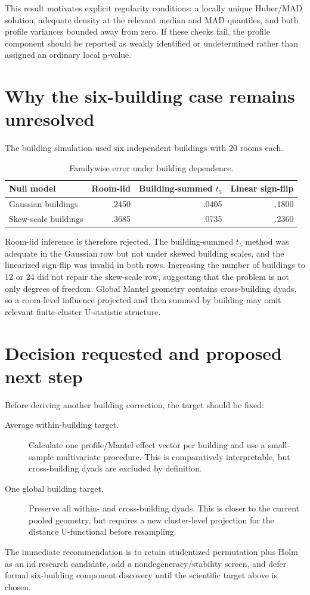 This result motivates explicit regularity conditions: a locally unique
Huber/MAD solution, adequate density at the relevant median and MAD
quantiles, and both profile variances bounded away from zero. If these checks
fail, the profile component should be reported as weakly identified or
undetermined rather than assigned an ordinary local p-value.

\section{Why the six-building case remains unresolved}

The building simulation used six independent buildings with 20 rooms each.

\begin{table}[ht]
\centering
\caption{Familywise error under building dependence.}
\small
\begin{tabular}{lrrr}
\hline
Null model & Room-iid & Building-summed $t_5$ & Linear sign-flip\\
\hline
Gaussian buildings & .2450 & .0405 & .1800\\
Skew-scale buildings & .3685 & .0735 & .2360\\
\hline
\end{tabular}
\end{table}

Room-iid inference is therefore rejected. The building-summed $t_5$ method
was adequate in the Gaussian row but not under skewed building scales, and
the linearized sign-flip was invalid in both rows. Increasing the number of
buildings to 12 or 24 did not repair the skew-scale row, suggesting that the
problem is not only degrees of freedom. Global Mantel geometry contains
cross-building dyads, so a room-level influence projected and then summed by
building may omit relevant finite-cluster U-statistic structure.

\section{Decision requested and proposed next step}

Before deriving another building correction, the target should be fixed:

\begin{description}
\item[Average within-building target.] Calculate one profile/Mantel effect
vector per building and use a small-sample multivariate procedure. This is
comparatively interpretable, but cross-building dyads are excluded by
definition.
\item[One global building target.] Preserve all within- and cross-building
dyads. This is closer to the current pooled geometry, but requires a new
cluster-level projection for the distance U-functional before resampling.
\end{description}

The immediate recommendation is to retain studentized permutation plus Holm
as an iid research candidate, add a nondegeneracy/stability screen, and defer
formal six-building component discovery until the scientific target above is
chosen.
